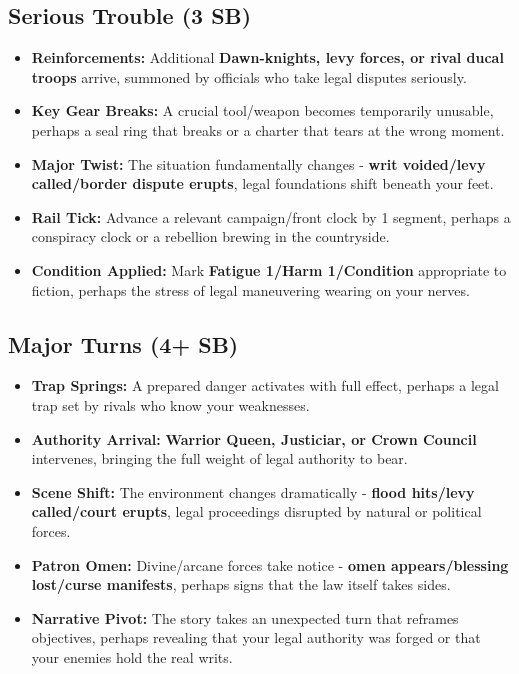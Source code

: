 \subsection*{Serious Trouble (3 SB)}
\begin{itemize}
\item \textbf{Reinforcements:} Additional \textbf{Dawn-knights, levy forces, or rival ducal troops} arrive, summoned by officials who take legal disputes seriously.
\item \textbf{Key Gear Breaks:} A crucial tool/weapon becomes temporarily unusable, perhaps a seal ring that breaks or a charter that tears at the wrong moment.
\item \textbf{Major Twist:} The situation fundamentally changes - \textbf{writ voided/levy called/border dispute erupts}, legal foundations shift beneath your feet.
\item \textbf{Rail Tick:} Advance a relevant campaign/front clock by 1 segment, perhaps a conspiracy clock or a rebellion brewing in the countryside.
\item \textbf{Condition Applied:} Mark \textbf{Fatigue 1/Harm 1/Condition} appropriate to fiction, perhaps the stress of legal maneuvering wearing on your nerves.
\end{itemize}

\subsection*{Major Turns (4+ SB)}
\begin{itemize}
\item \textbf{Trap Springs:} A prepared danger activates with full effect, perhaps a legal trap set by rivals who know your weaknesses.
\item \textbf{Authority Arrival:} \textbf{Warrior Queen, Justiciar, or Crown Council} intervenes, bringing the full weight of legal authority to bear.
\item \textbf{Scene Shift:} The environment changes dramatically - \textbf{flood hits/levy called/court erupts}, legal proceedings disrupted by natural or political forces.
\item \textbf{Patron Omen:} Divine/arcane forces take notice - \textbf{omen appears/blessing lost/curse manifests}, perhaps signs that the law itself takes sides.
\item \textbf{Narrative Pivot:} The story takes an unexpected turn that reframes objectives, perhaps revealing that your legal authority was forged or that your enemies hold the real writs.
\end{itemize}


